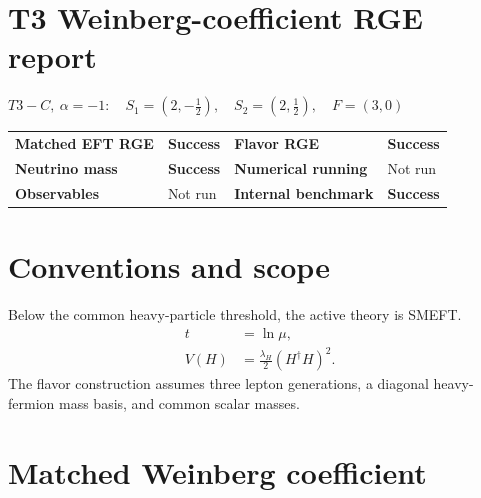 \documentclass[10pt]{article}
\begin{document}
\section*{T3 Weinberg-coefficient RGE report}
\noindent $T3-C,\ \alpha=-1:\quad S_1=(2,-\frac{1}{2}),\quad S_2=(2,\frac{1}{2}),\quad F=(3,0)$
\par\medskip
\begin{center}
\begin{tabular}{>{\bfseries}l l >{\bfseries}l l}
\toprule
Matched EFT RGE & \textcolor{green!45!black}{\textbf{Success}} & Flavor RGE & \textcolor{green!45!black}{\textbf{Success}} \\
Neutrino mass & \textcolor{green!45!black}{\textbf{Success}} & Numerical running & \textcolor{black!55}{Not run} \\
Observables & \textcolor{black!55}{Not run} & Internal benchmark & \textcolor{green!45!black}{\textbf{Success}} \\
\bottomrule
\end{tabular}
\end{center}
\section{Conventions and scope}
Below the common heavy-particle threshold, the active theory is SMEFT.
\begin{align*}
t&=\ln\mu,\\
V(H)&=\frac{\lambda_H}{2}(H^\dagger H)^2.
\end{align*}
The flavor construction assumes three lepton generations, a diagonal heavy-fermion mass basis, and common scalar masses.
\section{Matched Weinberg coefficient}
\noindent{}\par
\smallskip
\end{document}
